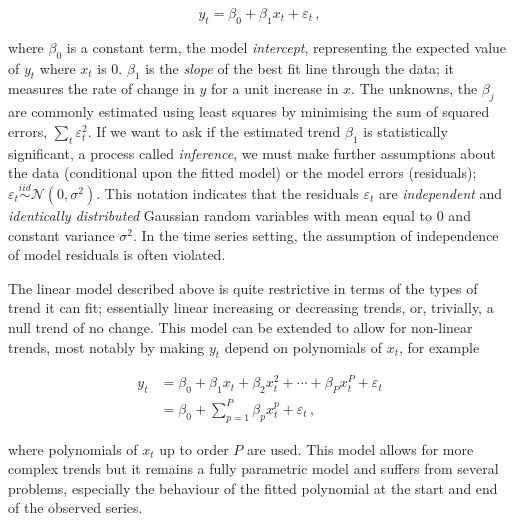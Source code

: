 \documentclass[12pt,]{article}
\begin{document}
\begin{equation} \label{eq:linear-model}
y_t = \beta_0 + \beta_1 x_t + \varepsilon_t \,,
\end{equation}

where \(\beta_0\) is a constant term, the model \emph{intercept},
representing the expected value of \(y_t\) where \(x_t\) is 0.
\(\beta_1\) is the \emph{slope} of the best fit line through the data;
it measures the rate of change in \(y\) for a unit increase in \(x\).
The unknowns, the \(\beta_j\) are commonly estimated using least squares
by minimising the sum of squared errors, \(\sum_t \varepsilon_t^2\). If
we want to ask if the estimated trend \(\beta_1\) is statistically
significant, a process called \emph{inference}, we must make further
assumptions about the data (conditional upon the fitted model) or the
model errors (residuals);
\(\varepsilon_t \stackrel{iid}{\sim} \mathcal{N}(0, \sigma^2)\). This
notation indicates that the residuals \(\varepsilon_t\) are
\emph{independent} and \emph{identically distributed} Gaussian random
variables with mean equal to \(0\) and constant variance \(\sigma^2\).
In the time series setting, the assumption of independence of model
residuals is often violated.

The linear model described above is quite restrictive in terms of the
types of trend it can fit; essentially linear increasing or decreasing
trends, or, trivially, a null trend of no change. This model can be
extended to allow for non-linear trends, most notably by making \(y_t\)
depend on polynomials of \(x_t\), for example

\begin{align} \label{eq:polynomial-model}
y_t &= \beta_0 + \beta_1 x_t + \beta_2 x_t^2 + \cdots + \beta_P x_t^P + \varepsilon_t \\
    &= \beta_0 + \sum_{p = 1}^P \beta_p x_t^p  + \varepsilon_t \,, \nonumber
\end{align}

where polynomials of \(x_t\) up to order \(P\) are used. This model
allows for more complex trends but it remains a fully parametric model
and suffers from several problems, especially the behaviour of the
fitted polynomial at the start and end of the observed series.
\end{document}

